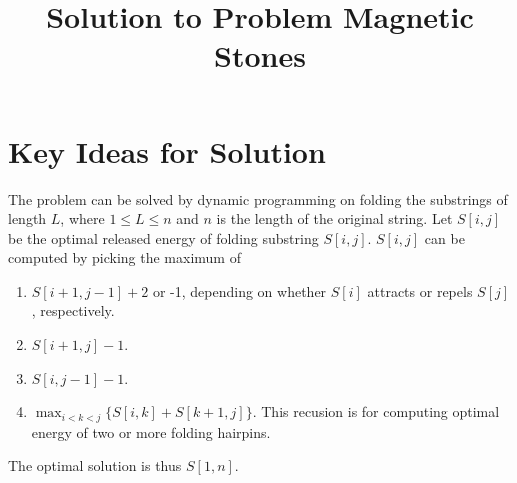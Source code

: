 \documentclass[12pt]{article}
\begin{document}
\title{Solution to Problem Magnetic Stones}
\author{}
\date{}
\maketitle

\section{Key Ideas for Solution}

The problem can be solved by dynamic programming on folding the substrings of length $L$, where $1 \le L \le n$ and $n$ is the length of the original string. 
Let $S[i,j]$ be the optimal released energy of folding substring $S[i,j]$. $S[i,j]$ can be computed by picking the maximum of 
  \begin{enumerate}
  \item $S[i+1,j-1]+2$ or -1, depending on whether $S[i]$ attracts or repels $S[j]$, respectively.
  \item $S[i+1,j]-1$.
  \item $S[i,j-1]-1$. 
  \item $\max_{i < k < j}\{S[i,k]+S[k+1,j]\}$. This recusion is for computing optimal energy of two or more folding hairpins.
  
  \end{enumerate}
The optimal solution is thus $S[1,n]$. 
\end{document}
